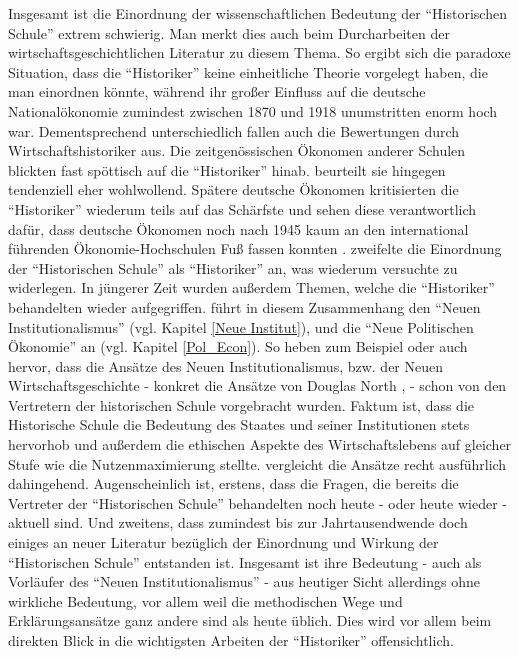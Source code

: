 Insgesamt ist die Einordnung der wissenschaftlichen Bedeutung der "`Historischen Schule"' extrem schwierig. Man merkt dies auch beim Durcharbeiten der wirtschaftsgeschichtlichen Literatur zu diesem Thema. So ergibt sich die paradoxe Situation, dass die "`Historiker"' keine einheitliche Theorie vorgelegt haben, die man einordnen könnte, während ihr großer Einfluss auf die deutsche Nationalökonomie zumindest zwischen 1870 und 1918 unumstritten enorm hoch war. Dementsprechend unterschiedlich fallen auch die Bewertungen durch Wirtschaftshistoriker aus. Die zeitgenössischen Ökonomen anderer Schulen blickten fast spöttisch auf die "`Historiker"' hinab. \textcite{Schumpeter1954} beurteilt sie hingegen tendenziell eher wohlwollend. Spätere deutsche Ökonomen kritisierten die "`Historiker"' wiederum teils auf das Schärfste und sehen diese verantwortlich dafür, dass deutsche Ökonomen noch nach 1945 kaum an den international führenden Ökonomie-Hochschulen Fuß fassen konnten \parencite[S. 115f]{Winkel1989}. \textcite{Pearson1999} zweifelte die Einordnung der "`Historischen Schule"' als "`Historiker"' an, was wiederum \textcite{Caldwell2001} versuchte zu widerlegen. In jüngerer Zeit wurden außerdem Themen, welche die "`Historiker"' behandelten wieder aufgegriffen. \textcite[S. 210]{Rosner2012} führt in diesem Zusammenhang den "`Neuen Institutionalismus"' (vgl. Kapitel \ref{Neue Institut}), und die "`Neue Politischen Ökonomie"' an (vgl. Kapitel \ref{Pol_Econ}). So heben zum Beispiel \textcite{Wischermann1993} oder auch \textcite{Plumpe1999} hervor, dass die Ansätze des Neuen Institutionalismus, bzw. der Neuen Wirtschaftsgeschichte - konkret die Ansätze von Douglas North \parencite[S. 243]{Wischermann1993}, \parencite[S. 257]{Plumpe1999} - schon von den Vertretern der historischen Schule vorgebracht wurden. Faktum ist, dass die Historische Schule die Bedeutung des Staates und seiner Institutionen stets hervorhob und außerdem die ethischen Aspekte des Wirtschaftslebens auf gleicher Stufe wie die Nutzenmaximierung stellte. \textcite{Richter1996} vergleicht die Ansätze recht ausführlich dahingehend. Augenscheinlich ist, erstens, dass die Fragen, die bereits die Vertreter der "`Historischen Schule"' behandelten noch heute - oder heute wieder - aktuell sind. Und zweitens, dass zumindest bis zur Jahrtausendwende doch einiges an neuer Literatur bezüglich der Einordnung und Wirkung der "`Historischen Schule"' entstanden ist. Insgesamt ist ihre Bedeutung - auch als Vorläufer des "`Neuen Institutionalismus"' - aus heutiger Sicht allerdings ohne wirkliche Bedeutung, vor allem weil die methodischen Wege und Erklärungsansätze ganz andere sind als heute üblich. Dies wird vor allem beim direkten Blick in die wichtigsten Arbeiten der "`Historiker"' offensichtlich. 




